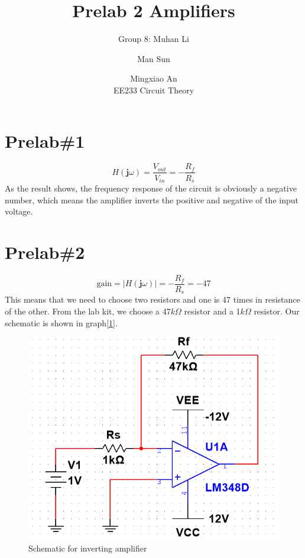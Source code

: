 \documentclass{IEEEtran}
\title{Prelab 2 Amplifiers}
\author{Group 8: Muhan Li \and Man Sun \and Mingxiao An \\ EE233 Circuit Theory}
\begin{document}
	\maketitle
	\section{\textbf{Prelab\#1}}
	\begin{equation*}
		H(\mathbf{j}\omega) = \frac{V_{out}}{V_{in}} = -\frac{R_f}{R_s}
	\end{equation*}
	\phantom{ } As the result shows, the frequency response of the circuit is obviously a negative number, which means the amplifier inverts the positive and negative of the input voltage.\\
	\section{\textbf{Prelab\#2}}
	\begin{equation*}
		\mathrm{gain} = | H(\mathbf{j}\omega) | = -\frac{R_f}{R_s} = -47
	\end{equation*}
	\phantom{ } This means that we need to choose two resistors and one is 47 times in resistance of the other. From the lab kit, we choose a 47$ \si{k\Omega} $ resistor and a 1$ \si{k\Omega} $ resistor. Our schematic is shown in graph[\ref{fig:201}].
	
	\begin{figure}[!htbp]
		\centering
		\begin{framed}
			\includegraphics[width=\linewidth]{images/2_1.PNG}
			\caption{Schematic for inverting amplifier}
			\label{fig:201}
		\end{framed}
	\end{figure}
\end{document}
